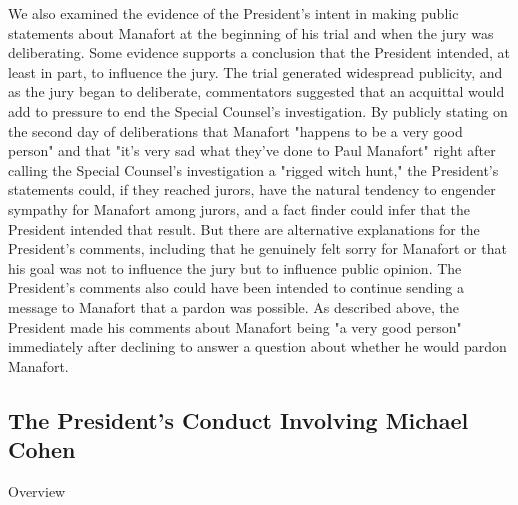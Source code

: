 {We also examined the evidence of the President's intent in making public statements about Manafort at the beginning of his trial and when the jury was deliberating.
Some evidence supports a conclusion that the President intended, at least in part, to influence the jury.
The trial generated widespread publicity, and as the jury began to deliberate, commentators suggested that an acquittal would add to pressure to end the Special Counsel's investigation.
By publicly stating on the second day of deliberations that Manafort "happens to be a very good person" and that "it's very sad what they've done to Paul Manafort" right after calling the Special Counsel's investigation a "rigged witch hunt," the President's statements could, if they reached jurors, have the natural tendency to engender sympathy for Manafort among jurors, and a fact finder could infer that the President intended that result.
But there are alternative explanations for the President's comments, including that he genuinely felt sorry for Manafort or that his goal was not to influence the jury but to influence public opinion.
The President's comments also could have been intended to continue sending a message to Manafort that a pardon was possible.
As described above, the President made his comments about Manafort being "a very good person" immediately after declining to answer a question about whether he would pardon Manafort.


\subsection{The President's Conduct Involving Michael Cohen}

Overview

}
